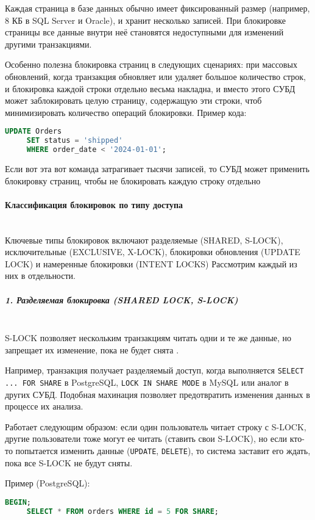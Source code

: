  Каждая страница в базе данных обычно имеет фиксированный размер (например, 8 КБ в SQL Server и Oracle), и хранит несколько записей. При блокировке страницы все данные внутри неё становятся недоступными для изменений другими транзакциями.
 
 Особенно полезна блокировка страниц в следующих сценариях: при массовых обновлений, когда транзакция обновляет или удаляет большое количество строк, и блокировка каждой строки отдельно весьма накладна, и вместо этого СУБД может заблокировать целую страницу, содержащую эти строки, чтоб минимизировать количество операций блокировки.
 Пример кода:
 \begin{lstlisting}[language=SQL]
     UPDATE Orders
     SET status = 'shipped' 
     WHERE order_date < '2024-01-01';
 \end{lstlisting}

 Если вот эта вот команда затрагивает тысячи записей, то СУБД может применить блокировку страниц, чтобы не блокировать каждую строку отдельно
 
 \paragraph{Классификация блокировок по типу доступа} ~\\
 
 Ключевые типы блокировок включают разделяемые (SHARED, S-LOCK), исключительные (EXCLUSIVE, X-LOCK), блокировки обновления (UPDATE LOCK) и намеренные блокировки (INTENT LOCKS)
 Рассмотрим каждый из них в отдельности.
 
 \subparagraph{1. Разделяемая блокировка (SHARED LOCK, S-LOCK)} ~\\

 S-LOCK позволяет нескольким транзакциям читать одни и те же данные, но запрещает их изменение, пока не будет снята \autocite{ElmasriNavathe}.

 Например, транзакция получает разделяемый доступ, когда выполняется \texttt{SELECT ... FOR SHARE} в PostgreSQL, \texttt{LOCK IN SHARE MODE} в MySQL или аналог в других СУБД.
 Подобная махинация позволяет предотвратить изменения данных в процессе их анализа.
 
 Работает следующим образом: если один пользователь читает строку с S-LOCK, другие пользователи тоже могут ее читать (ставить свои S-LOCK), но если кто-то попытается изменить данные (\texttt{UPDATE}, \texttt{DELETE}), то система заставит его ждать, пока все S-LOCK не будут сняты.
 
 Пример (PostgreSQL):
 \begin{lstlisting}[language=SQL]
     BEGIN;
     SELECT * FROM orders WHERE id = 5 FOR SHARE;    
 \end{lstlisting}

